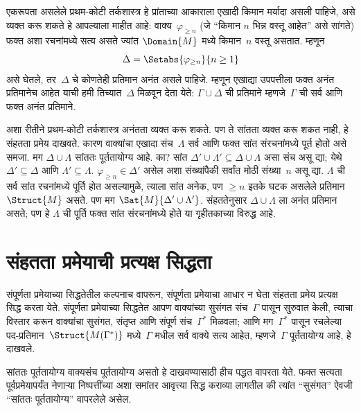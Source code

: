 \begin{ex}
एकरूपता असलेले प्रथम-कोटी तर्कशास्त्र हे प्रांताच्या आकाराला
एखादी किमान मर्यादा असली पाहिजे, असे व्यक्त करू शकते हे आपल्याला माहीत
आहे: वाक्य~$\varphi_{\ge n}$ (जे ``किमान $n$ भिन्न वस्तू आहेत'' असे सांगते)
फक्त अशा रचनांमध्ये सत्य असते ज्यांत $\Domain{M}$ मध्ये किमान~$n$ वस्तू
असतात. म्हणून
  \[  \Delta = \Setabs{\varphi_{\ge n}}{n \ge 1}
  \]
असे घेतले, तर~$\Delta$ चे कोणतेही प्रतिमान अनंत असले पाहिजे. म्हणून
एखाद्या उपपत्तीला फक्त अनंत प्रतिमानेच आहेत याची हमी तिच्यात~$\Delta$
मिळवून देता येते: $\Gamma \cup \Delta$ ची प्रतिमाने म्हणजे~$\Gamma$ ची
सर्व आणि फक्त अनंत प्रतिमाने.

अशा रीतीने प्रथम-कोटी तर्कशास्त्र अनंतता व्यक्त करू शकते. पण ते सांतता
व्यक्त करू शकत नाही, हे संहतता प्रमेय दाखवते. कारण वाक्यांचा
एखादा संच~$\Lambda$ सर्व आणि फक्त सांत संरचनांमध्ये पूर्त होतो
असे समजा. मग $\Delta \cup \Lambda$ सांततः पूर्ततायोग्य आहे. का? सांत
$\Delta' \cup \Lambda' \subseteq \Delta \cup \Lambda$ असा संच असू
द्या; येथे $\Delta' \subseteq \Delta$ आणि $\Lambda' \subseteq \Lambda$.
$\varphi_{\ge n} \in \Delta'$ असेल अशा संख्यांपैकी सर्वांत मोठी संख्या~$n$
असू द्या. $\Lambda$ ची सर्व सांत रचनांमध्ये पूर्ति होत असल्यामुळे,
त्याला सांत अनेक, पण $\ge n$ इतके घटक असलेले
प्रतिमान~$\Struct{M}$ असते. पण मग $\Sat{M}{\Delta' \cup \Lambda'}$.
संहततेनुसार $\Delta \cup \Lambda$ ला अनंत प्रतिमान असते; पण हे
$\Lambda$ ची पूर्ति फक्त सांत संरचनांमध्ये होते या गृहीतकाच्या
विरुद्ध आहे.
\end{ex}













\section{संहतता प्रमेयाची प्रत्यक्ष सिद्धता}\label{fol:com:cpd:sec}

संपूर्णता प्रमेयाच्या सिद्धतेतील कल्पनाच वापरून, संपूर्णता प्रमेयाचा आधार
न घेता संहतता प्रमेय प्रत्यक्ष सिद्ध करता येते. संपूर्णता प्रमेयाच्या
सिद्धतेत आपण वाक्यांच्या सुसंगत संच~$\Gamma$ पासून सुरुवात केली,
त्याचा विस्तार करून वाक्यांचा सुसंगत, संतृप्त आणि
संपूर्ण संच~$\Gamma^*$ मिळवला; आणि मग~$\Gamma^*$ पासून रचलेल्या
पद-प्रतिमान~$\Struct{M(\Gamma^*)}$
मध्ये~$\Gamma$ मधील सर्व वाक्ये सत्य आहेत, म्हणजे~$\Gamma$
पूर्ततायोग्य आहे, हे दाखवले.

सांततः पूर्ततायोग्य वाक्यसंच पूर्ततायोग्य असतो हे दाखवण्यासाठी हीच पद्धत
वापरता येते. फक्त सत्यता पूर्वप्रमेयापर्यंत नेणाऱ्या निष्पत्तींच्या अशा
समांतर आवृत्त्या सिद्ध कराव्या लागतील की त्यांत ``सुसंगत'' ऐवजी ``सांततः
पूर्ततायोग्य'' वापरलेले असेल.

